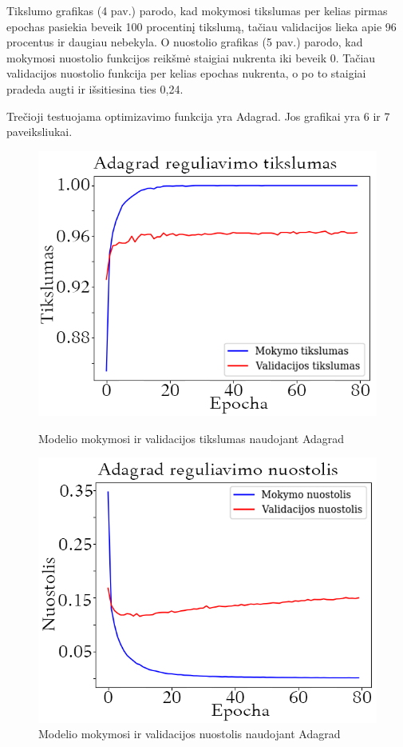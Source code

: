 \documentclass{VUMIFPSkursinis}
\begin{document}
Tikslumo grafikas (4 pav.) parodo, kad mokymosi tikslumas per kelias pirmas epochas pasiekia beveik 100 procentinį tikslumą, tačiau validacijos lieka apie 96 procentus ir daugiau nebekyla.
O nuostolio grafikas (5 pav.) parodo, kad mokymosi nuostolio funkcijos reikšmė staigiai nukrenta iki beveik 0. Tačiau validacijos nuostolio funkcija per kelias epochas nukrenta, o po to staigiai pradeda augti ir išsitiesina ties 0,24.

Trečioji testuojama optimizavimo funkcija yra Adagrad. Jos grafikai yra 6 ir 7 paveiksliukai.

\begin{figure}[!htbp]
  \centering
  \begin{minipage}[b]{0.49\textwidth}
    \includegraphics[width=\textwidth]{img/FT/Adagrad_acc1.png}
    \caption{Modelio mokymosi ir validacijos tikslumas naudojant Adagrad}
  \end{minipage}
  \begin{minipage}[b]{0.49\textwidth}
    \includegraphics[width=\textwidth]{img/FT/Adagrad_loss1.png}
    \caption{Modelio mokymosi ir validacijos nuostolis naudojant Adagrad}
  \end{minipage}
\end{figure}
\end{document}
